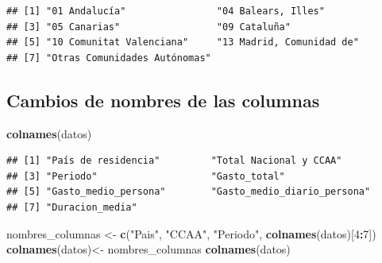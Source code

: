 \documentclass[notspecified,article,submit,moreauthors,pdftex]{Definitions/mdpi}
\newenvironment{Shaded}{\begin{snugshade}}{\end{snugshade}}
\newcommand{\AttributeTok}[1]{\textcolor[rgb]{0.13,0.29,0.53}{#1}}
\newcommand{\DecValTok}[1]{\textcolor[rgb]{0.00,0.00,0.81}{#1}}
\newcommand{\FunctionTok}[1]{\textcolor[rgb]{0.13,0.29,0.53}{\textbf{#1}}}
\newcommand{\NormalTok}[1]{#1}
\newcommand{\OtherTok}[1]{\textcolor[rgb]{0.56,0.35,0.01}{#1}}
\newcommand{\SpecialCharTok}[1]{\textcolor[rgb]{0.81,0.36,0.00}{\textbf{#1}}}
\newcommand{\StringTok}[1]{\textcolor[rgb]{0.31,0.60,0.02}{#1}}
\begin{document}
\begin{verbatim}
## [1] "01 Andalucía"                "04 Balears, Illes"          
## [3] "05 Canarias"                 "09 Cataluña"                
## [5] "10 Comunitat Valenciana"     "13 Madrid, Comunidad de"    
## [7] "Otras Comunidades Autónomas"
\end{verbatim}

\begin{Shaded}
\end{Shaded}

\subsection{Cambios de nombres de las
columnas}\label{cambios-de-nombres-de-las-columnas}

\begin{Shaded}
\begin{Highlighting}[]
\FunctionTok{colnames}\NormalTok{(datos)}
\end{Highlighting}
\end{Shaded}

\begin{verbatim}
## [1] "País de residencia"         "Total Nacional y CCAA"     
## [3] "Periodo"                    "Gasto_total"               
## [5] "Gasto_medio_persona"        "Gasto_medio_diario_persona"
## [7] "Duracion_media"
\end{verbatim}

\begin{Shaded}
\begin{Highlighting}[]
\NormalTok{nombres\_columnas }\OtherTok{\textless{}{-}} \FunctionTok{c}\NormalTok{(}\StringTok{"Pais"}\NormalTok{, }\StringTok{"CCAA"}\NormalTok{, }\StringTok{"Periodo"}\NormalTok{, }\FunctionTok{colnames}\NormalTok{(datos)[}\DecValTok{4}\SpecialCharTok{:}\DecValTok{7}\NormalTok{])}
\FunctionTok{colnames}\NormalTok{(datos)}\OtherTok{\textless{}{-}}\NormalTok{ nombres\_columnas}
\FunctionTok{colnames}\NormalTok{(datos)}
\end{Highlighting}
\end{Shaded}
\end{document}
